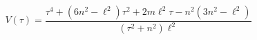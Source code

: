 \begin{equation}
V(\tau )=\frac{\tau ^{4}+\left( 6n^{2}-\ell ^{2}\right) \tau ^{2}+2m\ell
^{2}\tau -n^{2}\left( 3n^{2}-\ell ^{2}\right) }{\left( \tau
^{2}+n^{2}\right) \ell ^{2}}  \label{VV}
\end{equation}%
